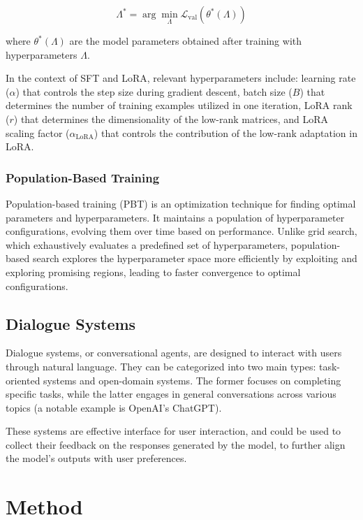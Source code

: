 \documentclass[11pt, onecolumn]{article}
\newcounter{para}
\begin{document}
\[
\Lambda^* = \arg\min_{\Lambda} \mathcal{L}_{\text{val}}(\theta^*(\Lambda))
\]

where \( \theta^*(\Lambda) \) are the model parameters obtained after training with hyperparameters \( \Lambda \).

In the context of SFT and LoRA, relevant hyperparameters include: learning rate (\( \alpha \)) that controls the step size during gradient descent, batch size (\( B \)) that determines the number of training examples utilized in one iteration, LoRA rank (\( r \)) that determines the dimensionality of the low-rank matrices, and LoRA scaling factor (\( \alpha_{\text{LoRA}} \)) that controls the contribution of the low-rank adaptation in LoRA.

\subsubsection{Population-Based Training}

Population-based training (PBT) is an optimization technique for finding optimal parameters and hyperparameters. It maintains a population of hyperparameter configurations, evolving them over time based on performance. Unlike grid search, which exhaustively evaluates a predefined set of hyperparameters, population-based search explores the hyperparameter space more efficiently by exploiting and exploring promising regions, leading to faster convergence to optimal configurations.

\subsection{Dialogue Systems}

Dialogue systems, or conversational agents, are designed to interact with users through natural language. They can be categorized into two main types: task-oriented systems and open-domain systems. The former focuses on completing specific tasks, while the latter engages in general conversations across various topics (a notable example is OpenAI's ChatGPT).

These systems are effective interface for user interaction, and could be used to collect their feedback on the responses generated by the model, to further align the model's outputs with user preferences.

\section{Method}
\end{document}
